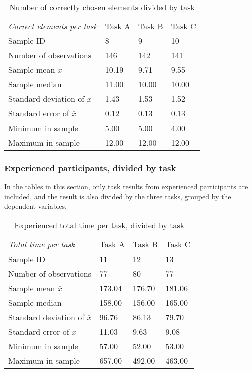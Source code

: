 \begin{table}[H]
	\centering
	\begin{tabular}{l|l|l|l}
		\textit{Correct elements per task} & Task A & Task B & Task C\\ 
		Sample ID & 8  & 9  & 10   \\ \hline
		Number of observations & 146    & 142     & 141        \\
		Sample mean $\overline{x}$ & 10.19  &  9.71  &   9.55   \\
		Sample median & 11.00 &  10.00  &  10.00   \\
		Standard deviation of $\overline{x}$ & 1.43  & 1.53 & 1.52    \\
		Standard error of $\overline{x}$ & 0.12 &  0.13 & 0.13  \\
		Minimum in sample  & 5.00  & 5.00  &   4.00  \\
		Maximum in sample  & 12.00 & 12.00  & 12.00 \\ \hline
	\end{tabular}
	\caption[Correct elements, divided by task]{Number of correctly chosen elements divided by task}
	\label{tab:totalcorrect_tasks}
\end{table}

\subsubsection{Experienced participants, divided by task}\label{sec:taskdivided_experienced}

In the tables in this section, only task results from experienced participants are included, and the result is also divided by the three tasks, grouped by the dependent variables.

\begin{table}[H]
	\centering
	\begin{tabular}{l|l|l|l}
		\textit{Total time per task} & Task A & Task B & Task C \\ 
		Sample ID & 11  & 12  & 13   \\ \hline
		Number of observations & 77  & 80   & 77  \\
		Sample mean $\overline{x}$  & 173.04  &  176.70  &  181.06   \\
		Sample median  & 158.00  &  156.00  &  165.00  \\
		Standard deviation of $\overline{x}$ & 96.76  & 86.13  & 79.70   \\
		Standard error of $\overline{x}$ & 11.03 & 9.63 & 9.08  \\
		Minimum in sample   & 57.00  & 52.00 &  53.00  \\
		Maximum in sample  & 657.00 & 492.00  & 463.00 \\ \hline
	\end{tabular}
	\caption[Total time, divided by task, only experienced]{Experienced total time per task, divided by task}
	\label{tab:totaltime_tasks_experienced}
\end{table}

